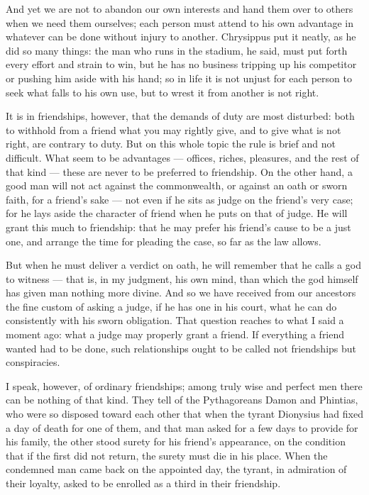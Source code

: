  And yet we are not to abandon our own interests and hand them over to others when we need them ourselves; each person must attend to his own advantage in whatever can be done without injury to another. Chrysippus put it neatly, as he did so many things: the man who runs in the stadium, he said, must put forth every effort and strain to win, but he has no business tripping up his competitor or pushing him aside with his hand; so in life it is not unjust for each person to seek what falls to his own use, but to wrest it from another is not right.

 It is in friendships, however, that the demands of duty are most disturbed: both to withhold from a friend what you may rightly give, and to give what is not right, are contrary to duty. But on this whole topic the rule is brief and not difficult. What seem to be advantages — offices, riches, pleasures, and the rest of that kind — these are never to be preferred to friendship. On the other hand, a good man will not act against the commonwealth, or against an oath or sworn faith, for a friend's sake — not even if he sits as judge on the friend's very case; for he lays aside the character of friend when he puts on that of judge. He will grant this much to friendship: that he may prefer his friend's cause to be a just one, and arrange the time for pleading the case, so far as the law allows.

 But when he must deliver a verdict on oath, he will remember that he calls a god to witness — that is, in my judgment, his own mind, than which the god himself has given man nothing more divine. And so we have received from our ancestors the fine custom of asking a judge, if he has one in his court, what he can do consistently with his sworn obligation. That question reaches to what I said a moment ago: what a judge may properly grant a friend. If everything a friend wanted had to be done, such relationships ought to be called not friendships but conspiracies.

 I speak, however, of ordinary friendships; among truly wise and perfect men there can be nothing of that kind. They tell of the Pythagoreans Damon and Phintias, who were so disposed toward each other that when the tyrant Dionysius had fixed a day of death for one of them, and that man asked for a few days to provide for his family, the other stood surety for his friend's appearance, on the condition that if the first did not return, the surety must die in his place. When the condemned man came back on the appointed day, the tyrant, in admiration of their loyalty, asked to be enrolled as a third in their friendship.

